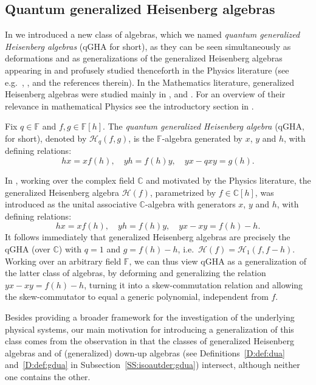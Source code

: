 \documentclass{commat}
\newcommand{\FF}{\mathbb{F}}
\newcommand{\CC}{\mathbb{C}}
\newcommand{\hqfg}[1][f,g]{\mathcal{H}_q(#1)}
\newcommand{\hh}{\mathcal{H}}
\begin{document}
\subsection{Quantum generalized Heisenberg algebras}\label{SS:rep:qgha}

In \cite{LR22ca} we introduced a new class of algebras, which we named \textit{quantum generalized Heisenberg algebras} (qGHA for short), as they can be seen simultaneously as deformations and as generalizations of the generalized Heisenberg algebras appearing in \cite{CRM01} and profusely studied thenceforth in the Physics literature (see e.g.~\cite{CRMR13}, \cite{BBH11}, \cite{BCG18} and the references therein). In the Mathematics literature, generalized Heisenberg algebras were studied mainly in \cite{LZ15}, \cite{LMZ15} and \cite{sL17}. For an overview of their relevance in mathematical Physics see the introductory section in \cite{LZ15}. 

\begin{definition}\label{D:qgha}
	Fix $q\in\FF$ and $f,g\in\FF[h]$.  The \textit{quantum generalized Heisenberg algebra} (qGHA, for short), denoted by $\hqfg$, is the $\FF$-algebra generated by $x$, $y$ and $h$, with defining relations:
	\begin{equation}\label{E:intro:def:qgha}
		hx=xf(h), \quad yh=f(h)y, \quad yx-qxy=g(h).
	\end{equation} 
\end{definition}

In \cite{LZ15}, working over the complex field $\CC$ and motivated by the Physics literature, the generalized Heisenberg algebra $\hh(f)$, parametrized by $f\in\CC[h]$, was introduced as the unital associative $\CC$-algebra with generators $x$, $y$ and $h$, with defining relations:
\begin{equation*}
	hx=xf(h), \quad yh=f(h)y, \quad yx-xy=f(h)-h.
\end{equation*}
It follows immediately that generalized Heisenberg algebras are precisely the qGHA (over $\CC$) with $q=1$ and $g=f(h)-h$, i.e.\ $\hh(f)=\hh_1(f, f-h)$. Working over an arbitrary field $\FF$, we can thus view qGHA as a generalization of the latter class of algebras, by deforming and generalizing the relation $yx-xy=f(h)-h$, turning it into a skew-commutation relation and allowing the skew-commutator to equal a generic polynomial, independent from $f$.

Besides providing a broader framework for the investigation of the underlying physical systems, our main motivation for introducing a generalization of this class comes from the observation in \cite{sL17} that the classes of generalized Heisenberg algebras and of (generalized) down-up algebras (see Definitions~\ref{D:def:dua} and~\ref{D:def:gdua} in Subsection~\ref{SS:isoautder:gdua}) intersect, although neither one contains the other. 
\end{document}
